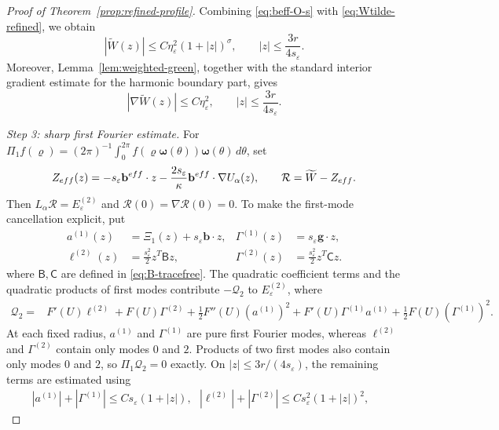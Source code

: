 \documentclass[10pt,a4paper]{amsart}
\numberwithin{equation}{section}
\theoremstyle{definition}
\theoremstyle{remark}
\newcommand{\eps}{\varepsilon}
\begin{document}
\begin{proof}[Proof of Theorem~\ref{prop:refined-profile}]
Combining \eqref{eq:beff-O-s} with
\eqref{eq:Wtilde-refined}, we obtain
\begin{equation}
  |\widetilde W(z)|
  \le
  C\eta_\eps^2(1+|z|)^\sigma,
  \qquad
  |z|\le\frac{3r}{4s_\eps}.
  \label{eq:Wtilde-O2-weighted}
\end{equation}
Moreover, Lemma~\ref{lem:weighted-green}, together with the standard
interior gradient estimate for the harmonic boundary part, gives
\begin{equation}
  |\nabla\widetilde W(z)|
  \le
  C\eta_\eps^2,
  \qquad
  |z|\le\frac{3r}{4s_\eps}.
  \label{eq:grad-Wtilde-O2}
\end{equation}

\medskip
\noindent
{ 
\emph{Step 3: sharp first Fourier estimate.}
}
For $\Pi_1f(\varrho)=(2\pi)^{-1}\int_0^{2\pi}
f(\varrho \boldsymbol\omega(\theta))\boldsymbol\omega(\theta)\,d\theta$, set
\begin{equation}\label{eq:P1-definition}
 Z_{\rm eff}(z)=-s_\eps \mathbf{b}^{\rm eff}\cdot z
 -\frac{2s_\eps}{\kappa}\mathbf{b}^{\rm eff}\cdot\nabla U_\alpha(z),
 \qquad \mathcal R=\widetilde W-Z_{\rm eff}.
\end{equation}
Then $L_\alpha\mathcal R=E_\eps^{(2)}$ and
$\mathcal R(0)=\nabla\mathcal R(0)=0$.
To make the first-mode cancellation explicit, put
\[
 \begin{aligned}
 a^{(1)}(z)&=\Xi_1(z)+s_\eps\mathbf b\cdot z,
 &\Gamma^{(1)}(z)&=s_\eps\mathbf g\cdot z,\\
 \ell^{(2)}(z)&=\frac{s_\eps^2}{2}z^T\mathsf Bz,
 &\Gamma^{(2)}(z)&=\frac{s_\eps^2}{2}z^T\mathsf Cz.
 \end{aligned}
\]
where $\mathsf B,\mathsf C$ are defined in \eqref{eq:B-tracefree}.
The quadratic coefficient terms and the quadratic products of first
modes contribute $-\mathcal Q_2$ to $E_\eps^{(2)}$, where
\[
 \begin{aligned}
 \mathcal Q_2={}&F'(U)\ell^{(2)}+F(U)\Gamma^{(2)}
  +\frac12F''(U)(a^{(1)})^2 +F'(U)\Gamma^{(1)}a^{(1)}
  +\frac12F(U)(\Gamma^{(1)})^2.
 \end{aligned}
\]
At each fixed radius, $a^{(1)}$ and $\Gamma^{(1)}$ are pure first
Fourier modes, whereas $\ell^{(2)}$ and $\Gamma^{(2)}$ contain only
modes $0$ and $2$. Products of two first modes also contain only
modes $0$ and $2$, so $\Pi_1\mathcal Q_2=0$ exactly.
On $|z|\le3r/(4s_\eps)$, the remaining terms are estimated using
\[
 \begin{aligned}
 |a^{(1)}|+|\Gamma^{(1)}|\le Cs_\eps(1+|z|),\ \ \
 |\ell^{(2)}|+|\Gamma^{(2)}|\le Cs_\eps^2(1+|z|)^2,\ \ \

\end{aligned}\]
\end{proof}
\end{document}
